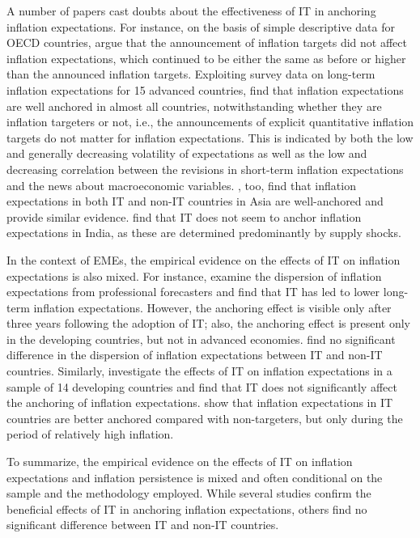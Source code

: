 \documentclass{article}
\begin{document}
A number of papers cast doubts about the effectiveness of IT in anchoring inflation expectations. For instance, on the basis of simple descriptive data for OECD countries, \citet{almeida1998} argue that the announcement of inflation targets did not affect inflation expectations, which continued to be either the same as before or higher than the announced inflation targets. Exploiting survey data on long-term inflation expectations for 15 advanced countries, \citet{castelnuovo2003} find that inflation expectations are well anchored in almost all countries, notwithstanding whether they are inflation targeters or not, i.e., the announcements of explicit quantitative inflation targets do not matter for inflation expectations. This is indicated by both the low and generally decreasing volatility of expectations as well as the low and decreasing correlation between the revisions in short-term inflation expectations and the news about macroeconomic variables. \citet{mohanty2015}, too, find that inflation expectations in both IT and non-IT countries in Asia are well-anchored and provide similar evidence. \citet{mohanty2022} find that IT does not seem to anchor inflation expectations in India, as these are determined predominantly by supply shocks.

In the context of EMEs, the empirical evidence on the effects of IT on inflation expectations is also mixed. For instance, \citet{capistran2010} examine the dispersion of inflation expectations from professional forecasters and find that IT has led to lower long-term inflation expectations. However, the anchoring effect is visible only after three years following the adoption of IT; also, the anchoring effect is present only in the developing countries, but not in advanced economies. \citet{lin2008} find no significant difference in the dispersion of inflation expectations between IT and non-IT countries. Similarly, \citet{zhang2015} investigate the effects of IT on inflation expectations in a sample of 14 developing countries and find that IT does not significantly affect the anchoring of inflation expectations. \citet{mohanty2015} show that inflation expectations in IT countries are better anchored compared with non-targeters, but only during the period of relatively high inflation.

To summarize, the empirical evidence on the effects of IT on inflation expectations and inflation persistence is mixed and often conditional on the sample and the methodology employed. While several studies confirm the beneficial effects of IT in anchoring inflation expectations, others find no significant difference between IT and non-IT countries.
\end{document}
